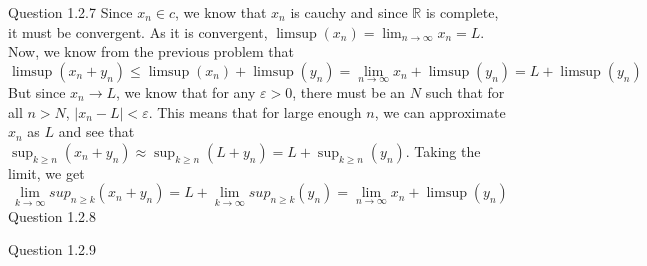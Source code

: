 \documentclass[12pt]{exam}
\begin{document}
\begin{questions}
\question Question 1.2.7\newline
Since $x_n \in c$, we know that $x_n$ is cauchy and since $\mathbb{R}$ is complete, it must be convergent. As it is convergent, $\limsup(x_n) = \lim_{n\rightarrow \infty}x_n = L$.  Now, we know from the previous problem that \[\limsup(x_n+y_n) \leq \limsup(x_n) + \limsup(y_n) =\lim_{n\rightarrow \infty}x_n + \limsup(y_n) = L + \limsup(y_n)\] But since $x_n \rightarrow L$, we know that for any $\varepsilon >0$, there must be an $N$ such that for all $n > N$, $|x_n - L| < \varepsilon$. This means that for large enough $n$, we can approximate $x_n$ as $L$ and see that $\sup_{k \geq n}(x_n+y_n) \approx \sup_{k \geq n}(L+y_n) = L + \sup_{k \geq n}(y_n) $. Taking the limit, we get \[\lim_{k\rightarrow \infty}sup_{n\geq k}(x_n+y_n) = L + \lim_{k\rightarrow \infty}sup_{n\geq k}(y_n) =  \lim_{n\rightarrow \infty}x_n + \limsup(y_n)\]
\question Question 1.2.8

\question Question 1.2.9
\begin{parts}

\end{parts}
\end{questions}
\end{document}
